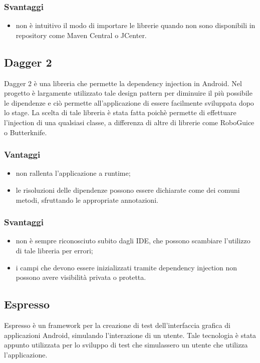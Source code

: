 \documentclass[../Tesi.tex]{subfiles}
\begin{document}
		\subsubsection{Svantaggi}
			\begin{itemize}
				\item non è intuitivo il modo di importare le librerie quando non sono disponibili in repository come Maven Central o JCenter.
			\end{itemize}

	\subsection{Dagger 2}
		Dagger 2 è una libreria che permette la dependency injection in Android. Nel progetto è largamente utilizzato tale design pattern per diminuire il più possibile le dipendenze e ciò permette all'applicazione di essere facilmente sviluppata dopo lo stage. La scelta di tale libreria è stata fatta poichè permette di effettuare l'injection di una qualsiasi classe, a differenza di altre di librerie come RoboGuice o Butterknife.
		\subsubsection{Vantaggi}
			\begin{itemize}
				\item non rallenta l'applicazione a runtime;
				\item le risoluzioni delle dipendenze possono essere dichiarate come dei comuni metodi, sfruttando le appropriate annotazioni.
			\end{itemize}
		\subsubsection{Svantaggi}
			\begin{itemize}
				\item non è sempre riconosciuto subito dagli IDE, che possono scambiare l'utilizzo di tale libreria per errori;
				\item i campi che devono essere inizializzati tramite dependency injection non possono avere visibilità privata o protetta.
			\end{itemize}

	\subsection{Espresso}
		Espresso è un framework per la creazione di test dell'interfaccia grafica di applicazioni Android, simulando l'interazione di un utente. Tale tecnologia è stata appunto utilizzata per lo sviluppo di test che simulassero un utente che utilizza l'applicazione.
\end{document}
